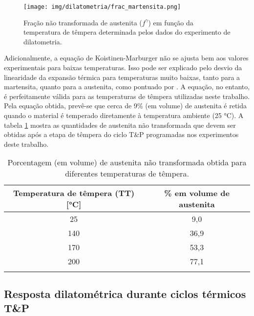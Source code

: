 \begin{figure}
	\texttt{[image: img/dilatometria/frac\_martensita.png]}
	\caption{Fração não transformada de austenita ($f^\gamma$) em função da temperatura de têmpera determinada pelos dados do experimento de dilatometria.}
	\label{fig:KMFoFo}
\end{figure}

Adicionalmente, a equação de Koistinen-Marburger não se ajusta bem aos valores experimentais para baixas temperaturas. Isso pode ser explicado pelo desvio da linearidade da expansão térmica para temperaturas muito baixas, tanto para a martensita, quanto para a austenita, como pontuado por . A equação, no entanto, é perfeitamente válida para as temperaturas de têmpera utilizadas neste trabalho. Pela equação obtida, prevê-se que cerca de 9\% (em volume) de austenita é retida quando o material é temperado diretamente à temperatura ambiente (25 °C). A tabela \ref{tab:austRetida} mostra as quantidades de austenita não transformada que devem ser obtidas após a etapa de têmpera do ciclo T\&P programadas nos experimentos deste trabalho.

\begin{table}
	\caption{Porcentagem (em volume) de austenita não transformada obtida para diferentes temperaturas de têmpera.}
	\begin{tabular}{c c}
	\thickhline
	Temperatura de têmpera (TT) [°C] & \% em volume de austenita\\
	\hline
	25 &  9,0\\
	140 & 36,9\\ 
	170 & 53,3\\
	200 & 77,1\\
	\thickhline
	\end{tabular}
	\label{tab:austRetida}
\end{table}

\subsection{Resposta dilatom\'{e}trica durante ciclos t\'{e}rmicos T\&P}

